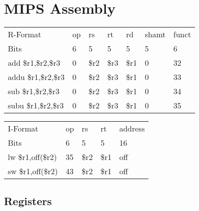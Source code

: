 \chapter{MIPS Assembly}
\label{c-mips}

\noindent
\begin{tabular}{p{1.5in}|p{.5in}|p{.5in}|p{.5in}|p{.5in}|p{.5in}|p{.5in}|}
  \cline{2-7}
  R-Format            & op & rs   & rt   & rd   & shamt & funct \\ \cline{2-7}
  Bits                & 6  & 5    & 5    & 5    & 5     & 6     \\ \cline{2-7}
  add \$r1,\$r2,\$r3  & 0  & \$r2 & \$r3 & \$r1 & 0     & 32    \\ \cline{2-7}
  addu \$r1,\$r2,\$r3 & 0  & \$r2 & \$r3 & \$r1 & 0     & 33    \\ \cline{2-7}
  sub \$r1,\$r2,\$r3  & 0  & \$r2 & \$r3 & \$r1 & 0     & 34    \\ \cline{2-7}
  subu \$r1,\$r2,\$r3 & 0  & \$r2 & \$r3 & \$r1 & 0     & 35    \\ \cline{2-7}
\end{tabular}

\vspace{.1in}\noindent
\begin{tabular}{p{1.5in}|p{.5in}|p{.5in}|p{.5in}|p{1.5in}|}
  \cline{2-5}
  I-Format          & op & rs   & rt   & address \\ \cline{2-5}
  Bits              & 6  & 5    & 5    & 16      \\ \cline{2-5}
  lw \$r1,off(\$r2) & 35 & \$r2 & \$r1 & off \\ \cline{2-5}
  sw \$r1,off(\$r2) & 43 & \$r2 & \$r1 & off \\ \cline{2-5}
\end{tabular}

\section{Registers}

